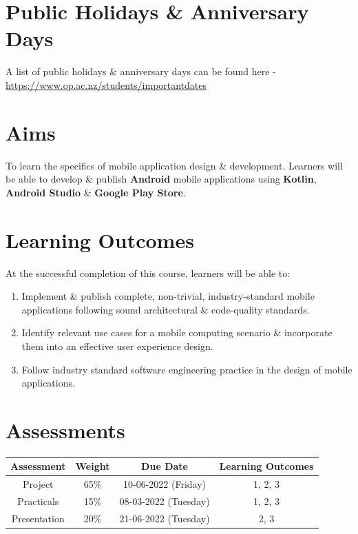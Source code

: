 \documentclass{article}
\begin{document}
\section*{Public Holidays \& Anniversary Days}
A list of public holidays \& anniversary days can be found here - \href{https://www.op.ac.nz/students/importantdates}{https://www.op.ac.nz/students/importantdates}

\section*{Aims}
To learn the specifics of mobile application design \& development. Learners will be able to develop \& publish \textbf{Android} mobile applications using \textbf{Kotlin}, \textbf{Android Studio} \& \textbf{Google Play Store}.

\section*{Learning Outcomes}
At the successful completion of this course, learners will be able to:
\begin{enumerate}
	\item Implement \& publish complete, non-trivial, industry-standard mobile applications following sound architectural \& code-quality standards.
	\item Identify relevant use cases for a mobile computing scenario \& incorporate them into an effective user experience design.
	\item Follow industry standard software engineering practice in the design of mobile applications.
\end{enumerate}

\section*{Assessments}
\renewcommand{\arraystretch}{1.5}
\begin{tabular}{|c|c|c|c|}
	\hline
	\textbf{Assessment} & \textbf{Weight} & \textbf{Due Date}    & \textbf{Learning Outcomes} \\ \hline
	Project             & 65\%            & 10-06-2022 (Friday)  & 1, 2, 3                    \\ \hline
	Practicals          & 15\%            & 08-03-2022 (Tuesday) & 1, 2, 3                    \\ \hline
	Presentation        & 20\%            & 21-06-2022 (Tuesday) & 2, 3                       \\ \hline
\end{tabular} 
\end{document}
